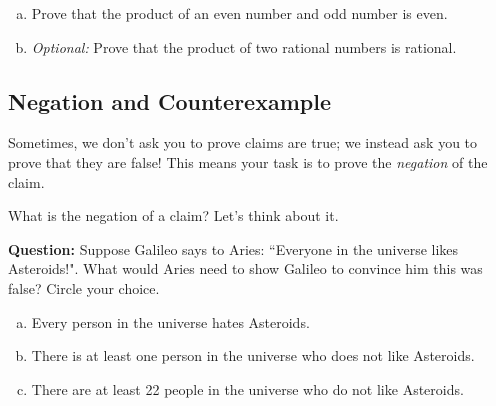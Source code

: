 \documentclass[12pt,letterpaper]{article}
\newif\ifsol
\begin{document}
      \begin{enumerate}[a.]
        \item Prove that the product of an even number and odd number is even. 

        \begin{mdframed}
		\ifsol  
		Consider $n$ odd and $m$ even. $n = 2a+1$ and $m = 2b$.

		Their product is $(2a + 1)(2b) = 4ab + 2b = 2(2ab + b)$.

		Since $2ab + b$ is an integer their product is even.
		\else
        \vspace{4cm}
		\fi
        \end{mdframed}
		
        \item \textit{Optional:} Prove that the product of two rational numbers is rational.

        \begin{mdframed}
		\ifsol
		Consider $n = \frac{a}{b}$ and $m = \frac{c}{d}$.

		Their product is $nm = \frac{ac}{bd}$. Since the product of two integers is an integer, we have just expressed $nm$ as the ratio of two integers. As $b$ and $d$ are both nonzero, so is their product. Therefore $nm$ is rational.
	 	\else
        \vspace{4cm}
		\fi
        \end{mdframed}

      \end{enumerate}

      \subsection*{Negation and Counterexample}

      Sometimes, we don't ask you to prove claims are true; we instead ask you to prove that they are false! This means your task is to prove the \textit{negation} of the claim. 

      What is the negation of a claim? Let's think about it. 
      
      \textbf{Question:} Suppose Galileo says to Aries: ``Everyone in the universe likes Asteroids!". What would Aries need to show Galileo to convince him this was false? Circle your choice.

      \begin{enumerate}[(a)]
      \item Every person in the universe hates Asteroids. 
      \item There is at least one person in the universe who does not like Asteroids.
      \item There are at least 22 people in the universe who do not like Asteroids. 
      \end{enumerate}
      
\end{document}
